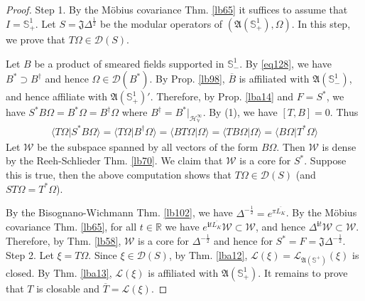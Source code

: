 \documentclass[12pt,b5paper,notitlepage]{article}
\theoremstyle{definition}
\theoremstyle{plain}
\newcommand{\fk}{\mathfrak}
\newcommand{\mc}{\mathcal}
\newcommand{\ovl}{\overline}
\newcommand{\Dom}{\scr{D}}
\newcommand{\bk}[1]{\langle {#1}\rangle}
\newcommand{\scr}{\mathscr}
\newcommand{\im}{\mathbf{i}}
\newcommand{\Rbb}{\mathbb R}
\newcommand{\Sbb}{{\mathbb S}}
\newcommand{\HV}{\mathcal H_{\mathbb V}}
\newcommand{\half}{\frac{1}{2}}
\numberwithin{equation}{section}
\begin{document}
\begin{proof}
Step 1. By the M\"obius covariance Thm. \ref{lb65} it suffices to assume that $I=\Sbb^1_+$. Let $S=\fk J\Delta^{\frac 12}$ be the modular operators of $(\fk A(\Sbb^1_+),\Omega)$. In this step, we prove that $T\Omega\in\Dom(S)$. 

Let $B$ be a product of smeared fields supported in $\Sbb^1_-$. By \eqref{eq128}, we have $B^*\supset B^\dagger$ and hence $\Omega\in\Dom(B^*)$. By Prop. \ref{lb98}, $\ovl B$ is affiliated with $\fk A(\Sbb^1_-)$, and hence affiliate with $\fk A(\Sbb^1_+)'$. Therefore, by Prop. \ref{lba14} and $F=S^*$, we have $S^*B\Omega=B^*\Omega=B^\dagger\Omega$ where $B^\dagger=B^*|_{\HV^\infty}$. By (1), we have $[T,B]=0$. Thus
\begin{align*}
\bk{T\Omega|S^*B\Omega}=\bk{T\Omega|B^\dagger\Omega}=\bk{BT\Omega|\Omega}=\bk{TB\Omega|\Omega}=\bk{B\Omega|T^*\Omega}
\end{align*}
Let $\mc W$ be the subspace spanned by all vectors of the form $B\Omega$. Then $\mc W$ is dense by the Reeh-Schlieder Thm. \ref{lb70}. We claim that $\mc W$ is a core for $S^*$. Suppose this is true, then the above computation shows that $T\Omega\in\Dom(S)$ (and $ST\Omega=T^*\Omega$).


By the Bisognano-Wichmann Thm. \ref{lb102}, we have $\Delta^{-\frac 12}=e^{\pi\ovl{L_K}}$. By the M\"obius covariance Thm. \ref{lb65}, for all $t\in\Rbb$ we have $e^{\im t\ovl{L_K}}\mc W\subset\mc W$, and hence $\Delta^{\im t}\mc W\subset\mc W$. Therefore, by Thm. \ref{lb58}, $\mc W$ is a core for $\Delta^{-\frac 12}$ and hence for $S^*=F=\fk J\Delta^{-\half}$.\\[-1ex]

Step 2. Let $\xi=T\Omega$. Since $\xi\in\Dom(S)$, by Thm. \ref{lba12}, $\scr L(\xi)=\scr L_{\fk A(\Sbb^+)}(\xi)$ is closed. By Thm. \ref{lba13}, $\scr L(\xi)$ is affiliated with $\fk A(\Sbb^1_+)$. It remains to prove that $T$ is closable and $\ovl T=\scr L(\xi)$.


\end{proof}
\end{document}
